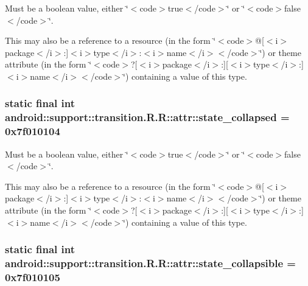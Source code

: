Must be a boolean value, either \char`\"{}$<$code$>$true$<$/code$>$\char`\"{} or \char`\"{}$<$code$>$false$<$/code$>$\char`\"{}. 

This may also be a reference to a resource (in the form \char`\"{}$<$code$>$@\mbox{[}$<$i$>$package$<$/i$>$:\mbox{]}$<$i$>$type$<$/i$>$:$<$i$>$name$<$/i$>$$<$/code$>$\char`\"{}) or theme attribute (in the form \char`\"{}$<$code$>$?\mbox{[}$<$i$>$package$<$/i$>$:\mbox{]}\mbox{[}$<$i$>$type$<$/i$>$:\mbox{]}$<$i$>$name$<$/i$>$$<$/code$>$\char`\"{}) containing a value of this type. \hypertarget{classandroid_1_1support_1_1transition_1_1_r_1_1attr_fb09775db8ccd9af38a91e3f4bc74c30}{
\subsubsection[{state\_\-collapsed}]{\setlength{\rightskip}{0pt plus 5cm}static final int android::support::transition.R.R::attr::state\_\-collapsed = 0x7f010104}}
\label{classandroid_1_1support_1_1transition_1_1_r_1_1attr_fb09775db8ccd9af38a91e3f4bc74c30}


Must be a boolean value, either \char`\"{}$<$code$>$true$<$/code$>$\char`\"{} or \char`\"{}$<$code$>$false$<$/code$>$\char`\"{}. 

This may also be a reference to a resource (in the form \char`\"{}$<$code$>$@\mbox{[}$<$i$>$package$<$/i$>$:\mbox{]}$<$i$>$type$<$/i$>$:$<$i$>$name$<$/i$>$$<$/code$>$\char`\"{}) or theme attribute (in the form \char`\"{}$<$code$>$?\mbox{[}$<$i$>$package$<$/i$>$:\mbox{]}\mbox{[}$<$i$>$type$<$/i$>$:\mbox{]}$<$i$>$name$<$/i$>$$<$/code$>$\char`\"{}) containing a value of this type. \hypertarget{classandroid_1_1support_1_1transition_1_1_r_1_1attr_1a37f9509756636ef5532374c230cce2}{
\subsubsection[{state\_\-collapsible}]{\setlength{\rightskip}{0pt plus 5cm}static final int android::support::transition.R.R::attr::state\_\-collapsible = 0x7f010105}}
\label{classandroid_1_1support_1_1transition_1_1_r_1_1attr_1a37f9509756636ef5532374c230cce2}



